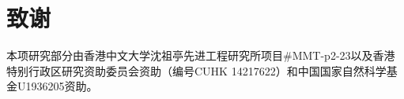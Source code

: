 \section*{致谢}

本项研究部分由香港中文大学沈祖亭先进工程研究所项目\#MMT-p2-23以及香港特别行政区研究资助委员会资助（编号CUHK 14217622）和中国国家自然科学基金U1936205资助。

